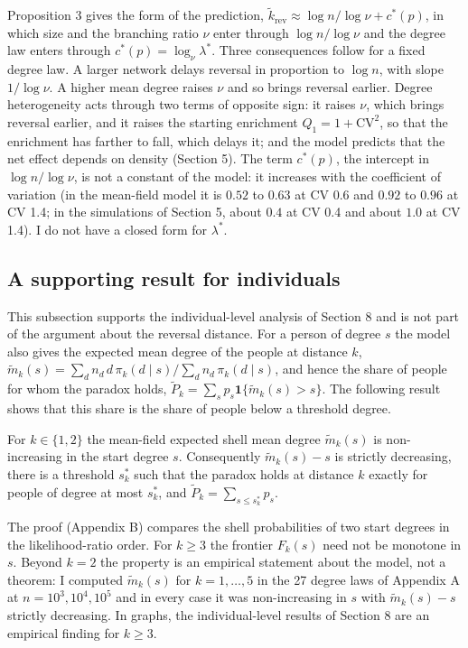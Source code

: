 \documentclass{nws}
\begin{document}
Proposition 3 gives the form of the prediction, $\tilde k_{\mathrm{rev}}\approx
\log n/\log\nu+c^*(p)$, in which size and the branching ratio $\nu$ enter through
$\log n/\log\nu$ and the degree law enters through $c^*(p)=\log_\nu\lambda^*$. Three
consequences follow for a fixed degree law. A larger network delays reversal in
proportion to $\log n$, with slope $1/\log\nu$. A higher mean degree raises $\nu$ and
so brings reversal earlier. Degree heterogeneity acts through two terms of opposite
sign: it raises $\nu$, which brings reversal earlier, and it raises the starting
enrichment $Q_1=1+\mathrm{CV}^2$, so that the enrichment has farther to fall, which
delays it; and the model predicts that the net effect depends on density
(Section 5). The term $c^*(p)$, the intercept in $\log n/\log\nu$, is not a constant of the model: it increases with the
coefficient of variation (in the mean-field model it is $0.52$ to $0.63$ at CV 0.6
and $0.92$ to $0.96$ at CV 1.4; in the simulations of Section 5, about $0.4$ at CV 0.4
and about $1.0$ at CV 1.4). I do not have a closed form for $\lambda^*$.

\subsection{A supporting result for individuals}

This subsection supports the individual-level analysis of Section 8 and is not part of the argument about the reversal distance. For a person of degree $s$ the model also gives the expected mean degree of the people at distance $k$, $\tilde m_k(s)=\sum_d n_d\,d\,\pi_k(d\mid s)\big/\sum_d n_d\,\pi_k(d\mid s)$, and hence the share of people for
whom the paradox holds, $\tilde P_k=\sum_s p_s\mathbf 1\{\tilde m_k(s)>s\}$. The
following result shows that this share is the share of people below a threshold
degree.

\begin{proposition}[4 --- Threshold structure for $k=1,2$]
For $k\in\{1,2\}$ the mean-field expected shell mean degree $\tilde m_k(s)$ is
non-increasing in the start degree $s$. Consequently $\tilde m_k(s)-s$ is strictly
decreasing, there is a threshold $s^*_k$ such that the paradox holds at distance $k$
exactly for people of degree at most $s^*_k$, and $\tilde P_k=\sum_{s\le s^*_k}p_s$.
\end{proposition}

The proof (Appendix B) compares the shell probabilities of two start degrees in the
likelihood-ratio order. For $k\ge3$ the frontier $F_k(s)$ need not be monotone in
$s$. Beyond $k=2$ the property is an empirical statement about the model, not a theorem: I computed $\tilde m_k(s)$ for $k=1,\ldots,5$ in the 27 degree laws of Appendix A at $n=10^3,10^4,10^5$ and in every case it was non-increasing in $s$ with $\tilde m_k(s)-s$ strictly decreasing. In graphs, the individual-level results of Section 8 are an empirical finding for $k\ge3$.
\end{document}
